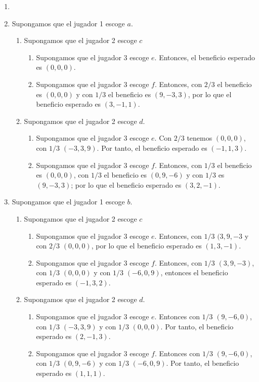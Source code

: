 \documentclass[twoside]{article}
\begin{document}
\begin{solucion}
\begin{enumerate}
\item[]
\item Supongamos que el jugador 1 escoge $a$. 
\begin{enumerate}[i]
\item Supongamos que el jugador 2 escoge $c$
\begin{enumerate}
\item Supongamos que el jugador 3 escoge $e$. Entonces, el beneficio esperado es $(0,0,0)$.
\item Supongamos que el jugador 3 escoge $f$. Entonces, con $2/3$ el beneficio es $(0,0,0)$ y con $1/3$ el beneficio es $(9,-3,3)$, por lo que el beneficio esperado es $(3,-1,1)$.
\end{enumerate}
\item Supongamos que el jugador 2 escoge $d$.
\begin{enumerate}
\item Supongamos que el jugador 3 escoge $e$. Con $2/3$ tenemos $(0,0,0)$, con $1/3$ $(-3,3,9)$. Por tanto, el beneficio esperado es $(-1,1,3)$.
\item Supongamos que el jugador 3 escoge $f$. Entonces, con $1/3$ el beneficio es $(0,0,0)$, con $1/3$ el beneficio es $(0,9,-6)$ y con $1/3$ es $(9,-3,3)$; por lo que el beneficio esperado es $(3,2,-1)$.
\end{enumerate}
\end{enumerate}
\item Supongamos que el jugador 1 escoge $b$. 
\begin{enumerate}[i]
\item Supongamos que el jugador 2 escoge $c$
\begin{enumerate}
\item Supongamos que el jugador 3 escoge $e$. Entonces, con $1/3$ $(3,9,-3$ y con $2/3$ $(0,0,0)$, por lo que el beneficio esperado es $(1,3,-1)$.
\item Supongamos que el jugador 3 escoge $f$. Entonces, con $1/3$ $(3,9,-3)$, con $1/3$ $(0,0,0)$ y con $1/3$ $(-6,0,9)$, entonces el beneficio esperado es $(-1,3,2)$.
\end{enumerate}
\item Supongamos que el jugador 2 escoge $d$.
\begin{enumerate}
\item Supongamos que el jugador 3 escoge $e$. Entonces con $1/3$ $(9,-6,0)$, con $1/3$ $(-3,3,9)$ y con $1/3$ $(0,0,0)$. Por tanto, el beneficio esperado es $(2,-1,3)$.
\item Supongamos que el jugador 3 escoge $f$. Entonces con $1/3$ $(9,-6,0)$, con $1/3$ $(0,9,-6)$ y con $1/3$ $(-6,0,9)$. Por tanto, el beneficio esperado es $(1,1,1)$.
\end{enumerate}
\end{enumerate}
\end{enumerate}

\end{solucion}
\newpage
\end{document}
